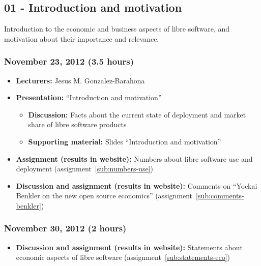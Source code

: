 \documentclass[a4paper]{article}
\begin{document}
\subsection{01 - Introduction and motivation}

Introduction to the economic and business aspects of libre software, and motivation about their importance and relevance.

\subsubsection{November 23, 2012 (3.5 hours)}

\begin{itemize}
\item \textbf{Lecturers:} Jesus M. Gonzalez-Barahona
\item \textbf{Presentation:} ``Introduction and motivation''
  \begin{itemize}
  \item \textbf{Discussion:} Facts about the current state of deployment and market share of libre software products
  \item \textbf{Supporting material:} Slides ``Introduction and motivation''
  \end{itemize}
\item \textbf{Assignment (results in website):} Numbers about libre software use and deployment (assignment~\ref{sub:numbers-use})
\item \textbf{Discussion and assignment (results in website):} Comments on ``Yockai Benkler on the new open source economics'' (assignment~\ref{sub:comments-benkler})
\end{itemize}

\subsubsection{November 30, 2012 (2 hours)}

\begin{itemize}
\item \textbf{Discussion and assignment (results in website):} Statements about economic aspects of libre software (assignment~\ref{sub:statements-eco})
\end{itemize}
\end{document}
